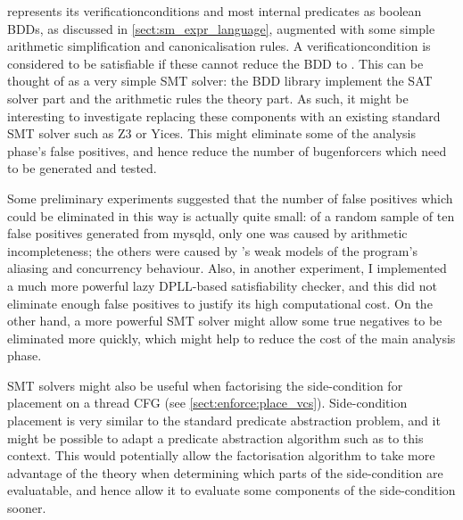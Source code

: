 {\Technique} represents its \glspl{verificationcondition} and most
internal predicates as boolean BDDs, as discussed in
\autoref{sect:sm_expr_language}, augmented with some simple arithmetic
simplification and canonicalisation rules.  A
\gls{verificationcondition} is considered to be satisfiable if these
cannot reduce the BDD to \false.  This can be thought of as a very
simple SMT solver\needCite{}: the BDD library implement the SAT solver
part and the arithmetic rules the theory part.  As such, it might be
interesting to investigate replacing these components with an existing
standard SMT solver such as Z3\needCite{} or Yices\needCite{}.  This
might eliminate some of the analysis phase's false positives, and
hence reduce the number of \glspl{bugenforcer} which need to be
generated and tested.

Some preliminary experiments suggested that the number of false
positives which could be eliminated in this way is actually quite
small: of a random sample of ten false positives generated from
mysqld, only one was caused by arithmetic incompleteness; the others
were caused by {\technique}'s weak models of the program's aliasing
and concurrency behaviour.  Also, in another experiment, I implemented
a much more powerful lazy DPLL-based satisfiability
checker\needCite{}, and this did not eliminate enough false positives
to justify its high computational cost.  On the other hand, a more
powerful SMT solver might allow some true negatives to be eliminated
more quickly, which might help to reduce the cost of the main analysis
phase.

SMT solvers might also be useful when factorising the side-condition
for placement on a thread CFG (see \autoref{sect:enforce:place_vcs}).
Side-condition placement is very similar to the standard predicate
abstraction problem\needCite{}, and it might be possible to adapt a
predicate abstraction algorithm such as \cite{Lahiri2006} to this
context.  This would potentially allow the factorisation algorithm to
take more advantage of the theory when determining which parts of the
side-condition are evaluatable, and hence allow it to evaluate some
components of the side-condition sooner.
